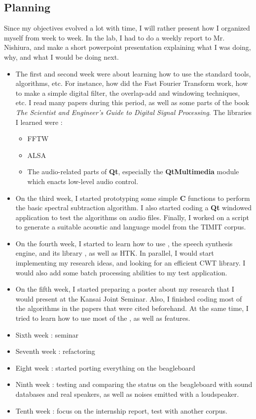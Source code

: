 \subsection{Planning}
Since my objectives evolved a lot with time, I will rather present how I organized myself from week to week.
In the lab, I had to do a weekly report to Mr. Nishiura, and make a short powerpoint presentation explaining what I was doing, why, and what I would be doing next.

\begin{itemize}
\item The first and second week were about learning how to use the standard tools, algorithms, etc. For instance, how did the Fast Fourier Transform work, how to make a simple digital filter, the overlap-add and windowing techniques, etc. I read many papers during this period, as well as some parts of the book \textit{The Scientist and Engineer's Guide to Digital Signal Processing}. The libraries I learned were : 
\begin{itemize}
\item \ac{FFTW}
\item \ac{ALSA}
\item The audio-related parts of \textbf{Qt}, especially the \textbf{QtMultimedia} module which enacts low-level audio control.
\end{itemize}
\item On the third week, I started prototyping some simple \textbf{C} functions to perform the basic spectral subtraction algorithm. I also started coding a \textbf{Qt} windowed application to test the algorithms on audio files. Finally, I worked on a script to generate a suitable acoustic and language model from the \ac{TIMIT} corpus.
\item On the fourth week, I started to learn how to use , the speech synthesis engine, and its library , as well as \ac{HTK}. In parallel, I would start implementing my research ideas, and looking for an efficient \ac{CWT} library. I would also add some batch processing abilities to my test application.
\item On the fifth week, I started preparing a poster about my research that I would present at the Kansai Joint Seminar. Also, I finished coding most of the algorithms in the papers that were cited beforehand. At the same time, I tried to learn how to use most of the  , as well as  features.
\item Sixth week : seminar
\item Seventh week : refactoring
\item Eight week : started porting everything on the beagleboard
\item Ninth week : testing and comparing the status on the beagleboard with sound databases and real speakers, as well as noises emitted with a loudspeaker.
\item Tenth week : focus on the internship report, test with another corpus.
\end{itemize}

